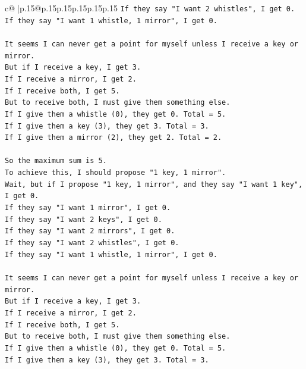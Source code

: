 \documentclass{article}
\begin{document}
{\begin{supertabular}{c@{$\;$}|p{.15\linewidth}@{}p{.15\linewidth}p{.15\linewidth}p{.15\linewidth}p{.15\linewidth}p{.15\linewidth}}
{{{\texttt{If they say "I want 2 whistles", I get 0.} \\
\texttt{If they say "I want 1 whistle, 1 mirror", I get 0.} \\
\\ 
\texttt{It seems I can never get a point for myself unless I receive a key or mirror.} \\
\texttt{But if I receive a key, I get 3.} \\
\texttt{If I receive a mirror, I get 2.} \\
\texttt{If I receive both, I get 5.} \\
\texttt{But to receive both, I must give them something else.} \\
\texttt{If I give them a whistle (0), they get 0. Total = 5.} \\
\texttt{If I give them a key (3), they get 3. Total = 3.} \\
\texttt{If I give them a mirror (2), they get 2. Total = 2.} \\
\\ 
\texttt{So the maximum sum is 5.} \\
\texttt{To achieve this, I should propose "1 key, 1 mirror".} \\
\texttt{Wait, but if I propose "1 key, 1 mirror", and they say "I want 1 key", I get 0.} \\
\texttt{If they say "I want 1 mirror", I get 0.} \\
\texttt{If they say "I want 2 keys", I get 0.} \\
\texttt{If they say "I want 2 mirrors", I get 0.} \\
\texttt{If they say "I want 2 whistles", I get 0.} \\
\texttt{If they say "I want 1 whistle, 1 mirror", I get 0.} \\
\\ 
\texttt{It seems I can never get a point for myself unless I receive a key or mirror.} \\
\texttt{But if I receive a key, I get 3.} \\
\texttt{If I receive a mirror, I get 2.} \\
\texttt{If I receive both, I get 5.} \\
\texttt{But to receive both, I must give them something else.} \\
\texttt{If I give them a whistle (0), they get 0. Total = 5.} \\
\texttt{If I give them a key (3), they get 3. Total = 3.} \\
}}}
\end{supertabular}}
\end{document}
